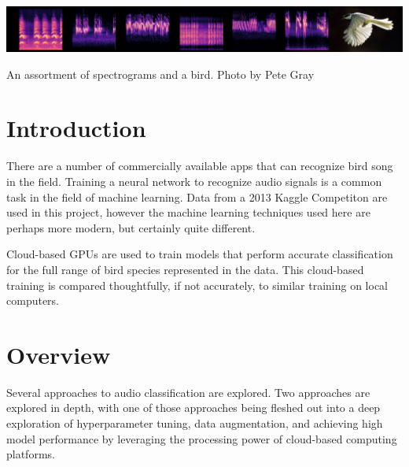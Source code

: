 \documentclass[sigconf]{acmart}
\begin{document}
\begin{teaserfigure}
  \includegraphics[width=\textwidth]{spectrograms-and-bird}
  \caption{An assortment of spectrograms and a bird. Photo by Pete Gray}
  \label{fig:teaser}
\end{teaserfigure}

\maketitle

\section{Introduction}
There are a number of commercially available apps that can 
recognize bird song in the field. Training a neural network to 
recognize audio signals is a common task in the field of
machine learning. Data from a 2013 Kaggle Competiton  \cite{Kaggle13} are
used in this project, however the machine learning techniques
used here are perhaps more modern, but certainly quite different.

Cloud-based GPUs are used
to train models that perform accurate classification for the full
range of bird species represented in the data. This cloud-based
training is compared thoughtfully, if not accurately, to similar
training on local computers.

\section{Overview}
Several approaches to audio classification are explored. Two approaches
are explored in depth, with one of those approaches being fleshed out
into a deep exploration of hyperparameter tuning, data augmentation, and
achieving high model performance by leveraging the processing power of
cloud-based computing platforms.
\end{document}
